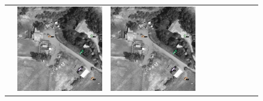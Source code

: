 \begin{figure}[h!]
\begin{tabularx}{\textwidth}{c|*{9}{X}}
    & \includegraphics[trim={730pt 220pt 200pt 720pt},clip,width=\linewidth]{images/015Results/03ablation/comp_images/red/523.png}
    & \includegraphics[trim={850pt 110pt 80pt 830pt},clip,width=\linewidth]{images/015Results/03ablation/comp_images/red/523.png}

\end{tabularx}
\end{figure}
